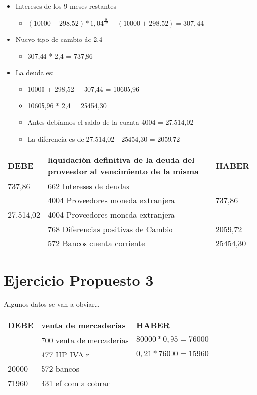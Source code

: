 \documentclass[a4paper,12pt]{article}
\newcommand{\bancos}{572 Bancos cuenta corriente}
\begin{document}
\begin{itemize}
    \item Intereses de los 9 meses restantes
    \begin{itemize}
        \item $\left(10000 + 298.52\right)*1,04^{\frac{9}{12}}-\left(10000 + 298.52\right)  = 307,44$
    \end{itemize}
    \item Nuevo tipo de cambio de 2,4
    \begin{itemize}
        \item 307,44 * 2,4 = 737,86
    \end{itemize}
    \item La deuda es:
    \begin{itemize}
        \item 10000 + 298,52 + 307,44 = 10605,96
        \item 10605,96 * 2,4 = 25454,30
        \item Antes debíamos el saldo de la cuenta 4004 = 27.514,02
        \item La diferencia es de 27.514,02 - 25454,30 = 2059,72
    \end{itemize}
\end{itemize}
\begin{table}[H]
    \centering
    \begin{tabular}{|p{3cm}|p{6cm}|p{3cm}|}
    \hline
    \textbf{DEBE} & \textbf{liquidación definitiva de la deuda del proveedor al vencimiento de la misma} & \textbf{HABER} \\
    \hline
    737,86& 662 Intereses de deudas& \\
    \hline
    & 4004 Proveedores moneda extranjera& 737,86\\
    \hline
    27.514,02& 4004 Proveedores moneda extranjera& \\
    \hline
    & 768 Diferencias positivas de Cambio& 2059,72\\
    \hline
    & \bancos & 25454,30\\
    \hline
    \end{tabular}
\end{table}


\section{Ejercicio Propuesto 3}

Algunos datos se van a obviar\dots

\begin{table}[H]
    \centering
    \begin{tabular}{|p{3cm}|p{6cm}|p{3cm}|}
    \hline
    \textbf{DEBE} & \textbf{venta de mercaderías} & \textbf{HABER} \\
    \hline
    & 700 venta de mercaderías& $80000*0,95=76000$\\
    \hline
    & 477 HP IVA r & $0,21*76000 = 15960$ \\
    \hline
    20000& 572 bancos & \\
    \hline
    71960 & 431 ef com a cobrar & \\
    \hline
    \end{tabular}
\end{table}
\end{document}

